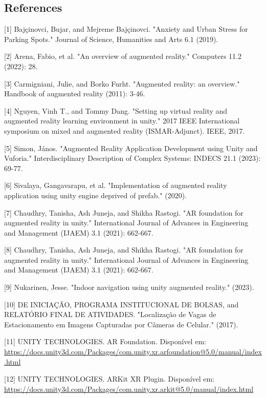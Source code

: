 \documentclass[11pt]{article}
\begin{document}
\begin{multicols}{2}
    \section{References}

	[1] Bajçinovci, Bujar, and Mejreme Bajçinovci. "Anxiety and Urban Stress for Parking Spots." Journal of Science, Humanities and Arts 6.1 (2019).
	
    \vspace{0,1cm}
	[2] Arena, Fabio, et al. "An overview of augmented reality." Computers 11.2 (2022): 28.
	
    \vspace{0,1cm}
	[3] Carmigniani, Julie, and Borko Furht. "Augmented reality: an overview." Handbook of augmented reality (2011): 3-46.
	
    \vspace{0,1cm}
	[4] Nguyen, Vinh T., and Tommy Dang. "Setting up virtual reality and augmented reality learning environment in unity." 2017 IEEE International symposium on mixed and augmented reality (ISMAR-Adjunct). IEEE, 2017.
	
    \vspace{0,1cm}
	[5] Simon, János. "Augmented Reality Application Development using Unity and Vuforia." Interdisciplinary Description of Complex Systems: INDECS 21.1 (2023): 69-77.

    \vspace{0,1cm}
	[6] Sivalaya, Gangavarapu, et al. "Implementation of augmented reality application using unity engine deprived of prefab." (2020).
	
    \vspace{0,1cm}
	[7] Chaudhry, Tanisha, Ash Juneja, and Shikha Rastogi. "AR foundation for augmented reality in unity." International Journal of Advances in Engineering and Management (IJAEM) 3.1 (2021): 662-667.
	
    \vspace{0,1cm}
	[8] Chaudhry, Tanisha, Ash Juneja, and Shikha Rastogi. "AR foundation for augmented reality in unity." International Journal of Advances in Engineering and Management (IJAEM) 3.1 (2021): 662-667.
	
    \vspace{0,1cm}
	[9] Nukarinen, Jesse. "Indoor navigation using unity augmented reality." (2023).
	
    \vspace{0,1cm}
	[10] DE INICIAÇÃO, PROGRAMA INSTITUCIONAL DE BOLSAS, and RELATÓRIO FINAL DE ATIVIDADES. "Localização de Vagas de Estacionamento em Imagens Capturadas por Câmeras de Celular." (2017).
	
    \vspace{0,1cm}
    [11] UNITY TECHNOLOGIES. AR Foundation. Disponível em: \url{https://docs.unity3d.com/Packages/com.unity.xr.arfoundation@5.0/manual/index.html}

    \vspace{0,1cm}
    [12] UNITY TECHNOLOGIES. ARKit XR Plugin. Disponível em: \url{https://docs.unity3d.com/Packages/com.unity.xr.arkit@5.0/manual/index.html}

\end{multicols}
\end{document}
